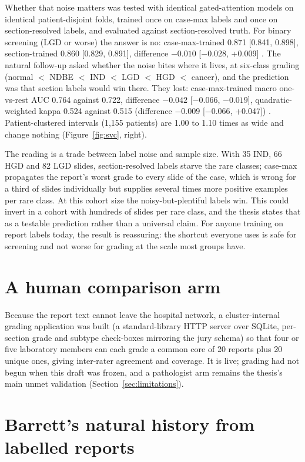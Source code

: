 Whether that noise matters was tested with identical gated-attention models on identical patient-disjoint folds, trained once on case-max labels and once on section-resolved labels, and evaluated against section-resolved truth. For binary screening (LGD or worse) the answer is no: case-max-trained 0.871 [0.841, 0.898], section-trained 0.860 [0.829, 0.891], difference $-0.010$ [$-0.028$, +0.009] . The natural follow-up asked whether the noise bites where it lives, at six-class grading (normal $<$ NDBE $<$ IND $<$ LGD $<$ HGD $<$ cancer), and the prediction was that section labels would win there. They lost: case-max-trained macro one-vs-rest AUC 0.764 against 0.722, difference $-0.042$ [$-0.066$, $-0.019$], quadratic-weighted kappa 0.524 against 0.515 (difference $-0.009$ [$-0.066$, +0.047]) . Patient-clustered intervals (1,155 patients) are 1.00 to 1.10 times as wide and change nothing (Figure~\ref{fig:svc}, right).

The reading is a trade between label noise and sample size. With 35 IND, 66 HGD and 82 LGD slides, section-resolved labels starve the rare classes; case-max propagates the report's worst grade to every slide of the case, which is wrong for a third of slides individually but supplies several times more positive examples per rare class. At this cohort size the noisy-but-plentiful labels win. This could invert in a cohort with hundreds of slides per rare class, and the thesis states that as a testable prediction rather than a universal claim. For anyone training on report labels today, the result is reassuring: the shortcut everyone uses is safe for screening and not worse for grading at the scale most groups have.

\section{A human comparison arm}

Because the report text cannot leave the hospital network, a cluster-internal grading application was built (a standard-library HTTP server over SQLite, per-section grade and subtype check-boxes mirroring the jury schema) so that four or five laboratory members can each grade a common core of 20 reports plus 20 unique ones, giving inter-rater agreement and coverage. It is live; grading had not begun when this draft was frozen, and a pathologist arm remains the thesis's main unmet validation (Section~\ref{sec:limitations}).

\section{Barrett's natural history from labelled reports}
\label{sec:natural_history}

